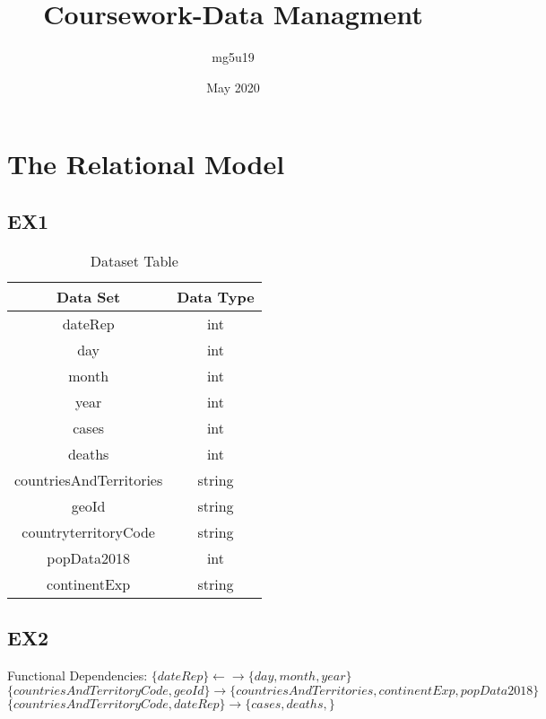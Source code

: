 \documentclass{article}
\title{Coursework-Data Managment}
\author{mg5u19 }
\date{May 2020}
\begin{document}
\maketitle

\section{The Relational Model}

\subsection{EX1}
\begin{table}[H]
    \centering
    \begin{tabular}{|c|c|}
        \hline
         Data Set & Data Type  \\
         \hline
         dateRep & int  \\
         \hline
         day & int  \\
         \hline
         month & int    \\
         \hline
         year & int     \\
         \hline
         cases & int    \\
         \hline
         deaths & int   \\
         \hline
         countriesAndTerritories & string   \\
         \hline
         geoId & string     \\
         \hline
         countryterritoryCode & string      \\
         \hline
         popData2018 & int      \\
         \hline
         continentExp & string      \\
         \hline
    \end{tabular}
    \caption{Dataset Table}
    \label{tab:my_label}
\end{table}

\subsection{EX2}
Functional Dependencies:
\newline
\newline
$\{dateRep\}  \longleftarrow \longrightarrow  \{day,month,year\}$
\newline
\newline
$\{countriesAndTerritoryCode,geoId\}  \longrightarrow  \{countriesAndTerritories,continentExp,popData2018\}$
\newline
\newline
$\{countriesAndTerritoryCode,dateRep\}  \longrightarrow  \{cases,deaths,\}$
\newline
\newline
\end{document}
